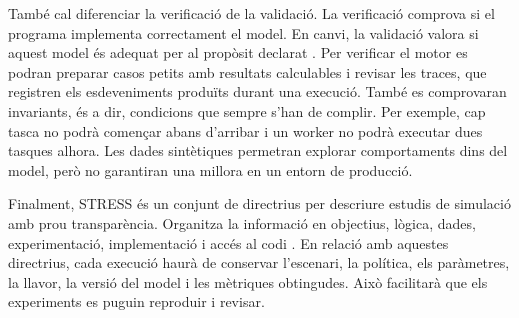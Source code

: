 També cal diferenciar la verificació de la validació. La verificació comprova si
el programa implementa correctament el model. En canvi, la validació valora si
aquest model és adequat per al propòsit declarat
\parencite{sargent2007verification}. Per verificar el motor es podran preparar
casos petits amb resultats calculables i revisar les traces, que registren els
esdeveniments produïts durant una execució. També es comprovaran invariants, és
a dir, condicions que sempre s'han de complir. Per exemple, cap tasca no podrà
començar abans d'arribar i un worker no podrà executar dues tasques alhora. Les
dades sintètiques permetran explorar comportaments dins del model, però no
garantiran una millora en un entorn de producció.

Finalment, STRESS és un conjunt de directrius per descriure estudis de simulació
amb prou transparència. Organitza la informació en objectius, lògica, dades,
experimentació, implementació i accés al codi \parencite{monks2019stress}. En
relació amb aquestes directrius, cada execució haurà de conservar l'escenari,
la política, els paràmetres, la llavor, la versió del model i les mètriques
obtingudes. Això facilitarà que els experiments es puguin reproduir i revisar.
